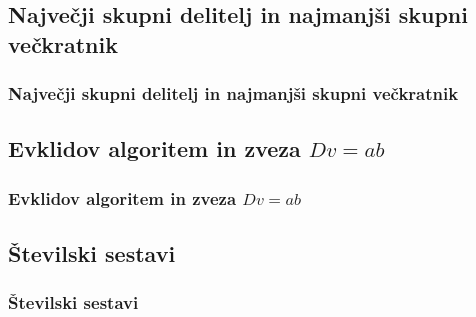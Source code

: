 

    \subsection{Največji skupni delitelj in najmanjši skupni večkratnik}

        \begin{frame}
            \frametitle{Največji skupni delitelj in najmanjši skupni večkratnik}
        \end{frame}


    \subsection{Evklidov algoritem in zveza $D v=ab$}

        \begin{frame}
            \frametitle{Evklidov algoritem in zveza $Dv=ab$}
        \end{frame}

    \subsection{Številski sestavi}

        \begin{frame}
            \frametitle{Številski sestavi}
        \end{frame}

